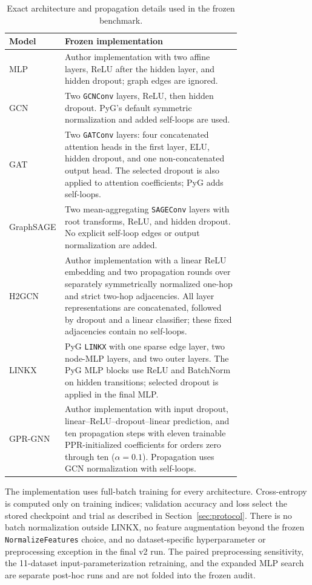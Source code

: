 \begin{table}[ht]
\centering
\caption{Exact architecture and propagation details used in the frozen benchmark.}
\label{tab:architecture_details}
\small
\begin{tabular}{@{}lp{0.76\linewidth}@{}}
\toprule
Model & Frozen implementation \\
\midrule
MLP & Author implementation with two affine layers, ReLU after the hidden layer, and hidden dropout; graph edges are ignored. \\
GCN & Two \texttt{GCNConv} layers, ReLU, then hidden dropout. PyG's default symmetric normalization and added self-loops are used. \\
GAT & Two \texttt{GATConv} layers: four concatenated attention heads in the first layer, ELU, hidden dropout, and one non-concatenated output head. The selected dropout is also applied to attention coefficients; PyG adds self-loops. \\
GraphSAGE & Two mean-aggregating \texttt{SAGEConv} layers with root transforms, ReLU, and hidden dropout. No explicit self-loop edges or output normalization are added. \\
H2GCN & Author implementation with a linear ReLU embedding and two propagation rounds over separately symmetrically normalized one-hop and strict two-hop adjacencies. All layer representations are concatenated, followed by dropout and a linear classifier; these fixed adjacencies contain no self-loops. \\
LINKX & PyG \texttt{LINKX} with one sparse edge layer, two node-MLP layers, and two outer layers. The PyG MLP blocks use ReLU and BatchNorm on hidden transitions; selected dropout is applied in the final MLP. \\
GPR-GNN & Author implementation with input dropout, linear--ReLU--dropout--linear prediction, and ten propagation steps with eleven trainable PPR-initialized coefficients for orders zero through ten ($\alpha=0.1$). Propagation uses GCN normalization with self-loops. \\
\bottomrule
\end{tabular}
\end{table}

The implementation uses full-batch training for every architecture. Cross-entropy is computed only on training indices; validation accuracy and loss select the stored checkpoint and trial as described in Section~\ref{sec:protocol}. There is no batch normalization outside LINKX, no feature augmentation beyond the frozen \texttt{NormalizeFeatures} choice, and no dataset-specific hyperparameter or preprocessing exception in the final v2 run. The paired preprocessing sensitivity, the 11-dataset input-parameterization retraining, and the expanded MLP search are separate post-hoc runs and are not folded into the frozen audit.

